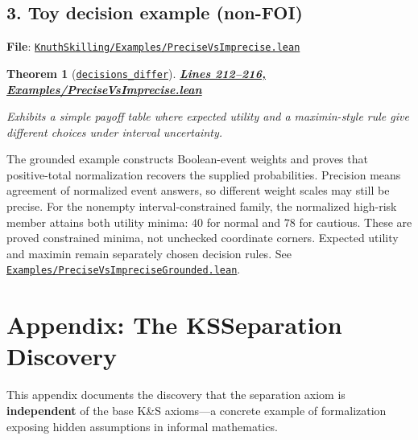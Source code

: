 \documentclass[11pt]{article}
\newtheorem{theorem}{Theorem}[section]
\theoremstyle{definition}
\theoremstyle{remark}
\begin{document}
\subsection*{3. Toy decision example (non-FOI)}

\textbf{File}: \href{https://github.com/zariuq/ks-foundations-of-inference/blob/main/KnuthSkilling/Examples/PreciseVsImprecise.lean}{\texttt{KnuthSkilling/Examples/PreciseVsImprecise.lean}}

\begin{theorem}[\href{https://github.com/zariuq/ks-foundations-of-inference/blob/main/KnuthSkilling/Examples/PreciseVsImprecise.lean}{\texttt{decisions\_differ}}]
\textbf{\href{https://github.com/zariuq/ks-foundations-of-inference/blob/main/KnuthSkilling/Examples/PreciseVsImprecise.lean}{Lines 212--216, Examples/PreciseVsImprecise.lean}}

Exhibits a simple payoff table where expected utility and a maximin-style rule give different choices
under interval uncertainty.
\end{theorem}

The grounded example constructs Boolean-event weights and proves that positive-total
normalization recovers the supplied probabilities. Precision means agreement of
normalized event answers, so different weight scales may still be precise.
For the nonempty interval-constrained family, the normalized high-risk member
attains both utility minima: $40$ for normal and $78$ for cautious. These are
proved constrained minima, not unchecked coordinate corners. Expected utility
and maximin remain separately chosen decision rules. See
\href{https://github.com/zariuq/ks-foundations-of-inference/blob/main/KnuthSkilling/Examples/PreciseVsImpreciseGrounded.lean}{\texttt{Examples/PreciseVsImpreciseGrounded.lean}}.

\section*{Appendix: The KSSeparation Discovery}
\label{app:separation-history}

This appendix documents the discovery that the separation axiom is \textbf{independent} of the
base K\&S axioms---a concrete example of formalization exposing hidden assumptions in informal
mathematics.
\end{document}
